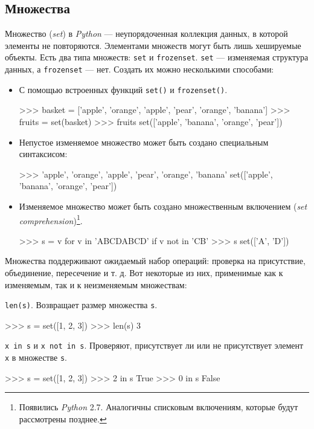 \subsection{Множества}
Множество (\emph{set}) в \emph{Python} — неупорядоченная коллекция данных, в которой элементы не повторяются. Элементами множеств могут быть лишь хешируемые объекты. Есть два типа множеств: \lstinline{set} и \lstinline{frozenset}. \lstinline{set} — изменяемая структура данных, а \lstinline{frozenset} — нет. Создать их можно несколькими способами:
\begin{itemize}
  \item С помощью встроенных функций \lstinline{set()} и \lstinline{frozenset()}.
\begin{pylst}{}{}
>>> basket = ['apple', 'orange', 'apple', 'pear', 'orange', 'banana']
>>> fruits = set(basket)
>>> fruits
set(['apple', 'banana', 'orange', 'pear'])
\end{pylst}

  \item Непустое изменяемое множество может быть создано специальным синтаксисом:
\begin{pylst}{}{}
>>> { 'apple', 'orange', 'apple', 'pear', 'orange', 'banana' }
set(['apple', 'banana', 'orange', 'pear'])
\end{pylst}

  \item Изменяемое множество может быть создано множественным включением (\emph{set comprehension})\footnote{Появились \emph{Python} 2.7. Аналогичны списковым включениям, которые будут рассмотрены позднее.}.
\begin{pylst}{}{}
>>> s = { v for v in 'ABCDABCD' if v not in 'CB' }
>>> s
set(['A', 'D'])
\end{pylst}
\end{itemize}

Множества поддерживают ожидаемый набор операций: проверка на присутствие, объединение, пересечение и т. д. Вот некоторые из них, применимые как к изменяемым, так и к неизменяемым множествам:

\lstinline{len(s)}. Возвращает размер множества \lstinline{s}.
\begin{pylst}{}{}
>>> s = set([1, 2, 3])
>>> len(s)
3
\end{pylst}

\lstinline{x in s} и \lstinline{x not in s}. Проверяют, присутствует ли или не присутствует элемент \lstinline{x} в множестве \lstinline{s}.
\begin{pylst}{}{}
>>> s = set([1, 2, 3])
>>> 2 in s
True
>>> 0 in s
False
\end{pylst}

